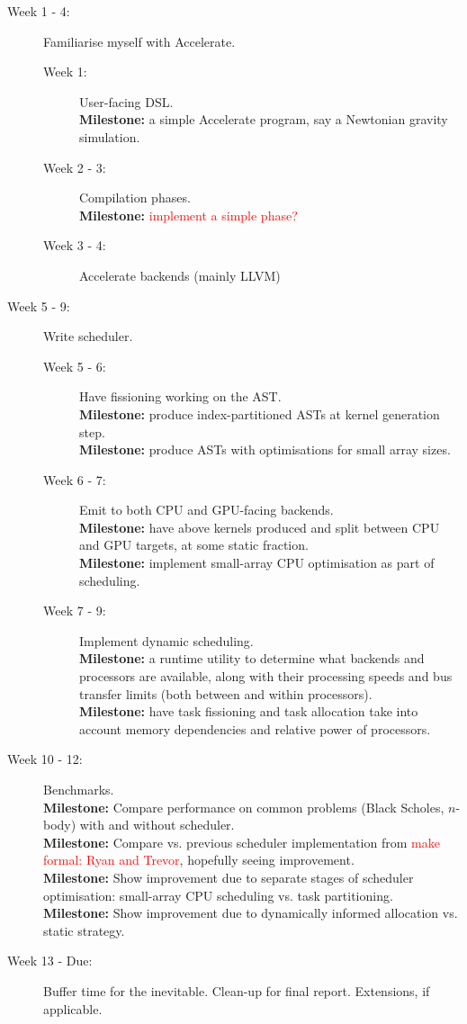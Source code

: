 \documentclass[a4paper,12pt]{article}
\newcommand{\red}[1]{\textcolor{red}{#1}}
\newcommand{\milestone}[0]{\textbf{Milestone:} }
\begin{document}
\begin{description}
  \item[Week 1 - 4:] 
    Familiarise myself with Accelerate.
    \begin{description}
      \item[Week 1:] 
        User-facing DSL. 
        \\\milestone a simple Accelerate program, say a Newtonian gravity simulation.
      \item[Week 2 - 3:] 
        Compilation phases. 
        \\\milestone \red{implement a simple phase?}
      \item[Week 3 - 4:] 
        Accelerate backends (mainly LLVM)
    \end{description}
  \item[Week 5 - 9:] 
    Write scheduler.
    \begin{description}
      \item[Week 5 - 6:] 
        Have fissioning working on the AST. 
        \\\milestone produce index-partitioned ASTs at kernel generation step.
        \\\milestone produce ASTs with optimisations for small array sizes.
      \item[Week 6 - 7:]
        Emit to both CPU and GPU-facing backends. 
        \\\milestone have above kernels produced and split between CPU and GPU targets, at some static fraction.
        \\\milestone implement small-array CPU optimisation as part of scheduling.
      \item[Week 7 - 9:]
        Implement dynamic scheduling.
        \\\milestone a runtime utility to determine what backends and processors are available, along with their processing speeds and bus transfer limits (both between and within processors).
        \\\milestone have task fissioning and task allocation take into account memory dependencies and relative power of processors.
    \end{description}
  \item[Week 10 - 12:]
    Benchmarks.
    \\\milestone Compare performance on common problems (Black Scholes, $n$-body) with and without scheduler.
    \\\milestone Compare vs. previous scheduler implementation from \red{make formal: Ryan and Trevor}, hopefully seeing improvement.
    \\\milestone Show improvement due to separate stages of scheduler optimisation: small-array CPU scheduling vs. task partitioning.
    \\\milestone Show improvement due to dynamically informed allocation vs. static strategy.
  \item[Week 13 - Due:] Buffer time for the inevitable. Clean-up for final report. Extensions, if applicable.
\end{description}

\pagebreak

\footnotesize



\end{document}

